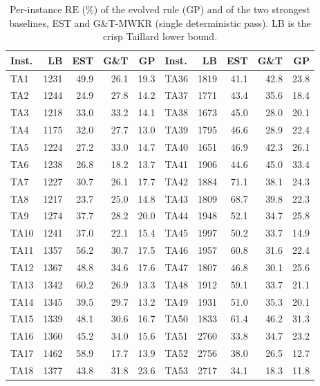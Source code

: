\documentclass[11pt]{article}
\newcommand{\RE}{\mathrm{RE}}
\begin{document}
\begin{table}[!htb]
\centering\scriptsize
\caption{Per-instance $\RE$ (\%) of the evolved rule (GP) and of the two
strongest baselines, EST and G\&T-MWKR (single deterministic pass). LB is
the crisp Taillard lower bound.}
\label{tab:perinstance}
\renewcommand{\arraystretch}{0.92}
\setlength{\tabcolsep}{4pt}
\begin{tabular}{lrrrr@{\hskip 0.9em}|@{\hskip 0.9em}lrrrr}
\toprule
Inst. & LB & EST & G\&T & GP & Inst. & LB & EST & G\&T & GP \\
\midrule
TA1 & 1231 & 49.9 & 26.1 & 19.3 & TA36 & 1819 & 41.1 & 42.8 & 23.8 \\
TA2 & 1244 & 24.9 & 27.8 & 14.2 & TA37 & 1771 & 43.4 & 35.6 & 18.4 \\
TA3 & 1218 & 33.0 & 33.2 & 14.1 & TA38 & 1673 & 45.0 & 28.0 & 20.1 \\
TA4 & 1175 & 32.0 & 27.7 & 13.0 & TA39 & 1795 & 46.6 & 28.9 & 22.4 \\
TA5 & 1224 & 27.2 & 33.0 & 14.7 & TA40 & 1651 & 46.9 & 42.3 & 26.1 \\
TA6 & 1238 & 26.8 & 18.2 & 13.7 & TA41 & 1906 & 44.6 & 45.0 & 33.4 \\
TA7 & 1227 & 30.7 & 26.1 & 17.7 & TA42 & 1884 & 71.1 & 38.1 & 24.3 \\
TA8 & 1217 & 23.7 & 25.0 & 14.8 & TA43 & 1809 & 68.7 & 39.8 & 22.3 \\
TA9 & 1274 & 37.7 & 28.2 & 20.0 & TA44 & 1948 & 52.1 & 34.7 & 25.8 \\
TA10 & 1241 & 37.0 & 22.1 & 15.4 & TA45 & 1997 & 50.2 & 33.7 & 14.9 \\
TA11 & 1357 & 56.2 & 30.7 & 17.5 & TA46 & 1957 & 60.8 & 31.6 & 22.4 \\
TA12 & 1367 & 48.8 & 34.6 & 17.6 & TA47 & 1807 & 46.8 & 30.1 & 25.6 \\
TA13 & 1342 & 60.2 & 26.9 & 13.3 & TA48 & 1912 & 59.1 & 33.7 & 21.1 \\
TA14 & 1345 & 39.5 & 29.7 & 13.2 & TA49 & 1931 & 51.0 & 35.3 & 20.1 \\
TA15 & 1339 & 48.1 & 30.6 & 16.7 & TA50 & 1833 & 61.4 & 46.2 & 31.3 \\
TA16 & 1360 & 45.2 & 34.0 & 15.6 & TA51 & 2760 & 33.8 & 34.7 & 23.2 \\
TA17 & 1462 & 58.9 & 17.7 & 13.9 & TA52 & 2756 & 38.0 & 26.5 & 12.7 \\
TA18 & 1377 & 43.8 & 31.8 & 23.6 & TA53 & 2717 & 34.1 & 18.3 & 11.8 \\

\end{tabular}
\end{table}
\end{document}
